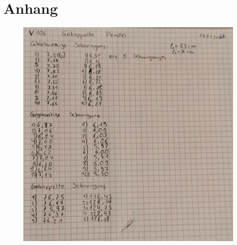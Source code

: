 \section{Anhang}\label{sec:Anhang}
\begin{figure}[h]
   \centering
    \includegraphics[scale=0.2]{Abbildungen/KladdeS1.jpeg}
\end{figure}
\pagebreak